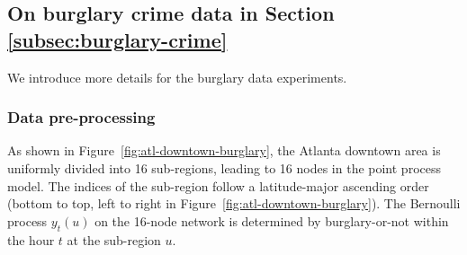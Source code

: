 \documentclass[11pt]{article}
\newcommand{\rev}[1]{{\textcolor{cyan}{#1}}}
\theoremstyle{remark}
\theoremstyle{plain}
\begin{document}




%
%
%



\subsection{On burglary crime data in Section \ref{subsec:burglary-crime}}\label{apdx:burglary}


We introduce more details for the burglary data experiments. 



\subsubsection{Data pre-processing}\label{apdx:data-processing-burglary}
As shown in Figure~\ref{fig:atl-downtown-burglary}, the Atlanta downtown area is uniformly divided into 16 sub-regions, leading to 16 nodes in the point process model. The indices of the sub-region follow a latitude-major ascending order (bottom to top, left to right in Figure~\ref{fig:atl-downtown-burglary}).
%
The Bernoulli process $y_t(u)$ on the 16-node network is determined by burglary-or-not within the hour $t$ at the sub-region $u$.
\end{document}
